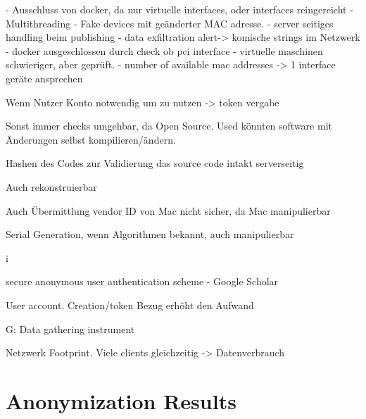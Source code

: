 - Ausschluss von docker, da nur virtuelle interfaces, oder interfaces reingereicht
- Multithreading
- Fake devices mit geänderter MAC adresse.
- server seitiges handling beim publishing
- data exfiltration alert-> komische strings im Netzwerk
- docker ausgeschlossen durch check ob pci interface
- virtuelle maschinen schwieriger, aber geprüft.
- number of available mac addresses -> 1 interface geräte ansprechen

Wenn Nutzer Konto notwendig um zu nutzen -> token vergabe

Sonst immer checks umgehbar, da Open Source. Used könnten software mit Änderungen selbst kompilieren/ändern.

Hashen des Codes zur Validierung das source code intakt serverseitig

Auch rekonstruierbar

Auch Übermittlung vendor ID von Mac nicht sicher, da Mac manipulierbar

Serial Generation, wenn Algorithmen bekannt, auch manipulierbar

i%

secure anonymous user authentication scheme - Google Scholar



User account. Creation/token Bezug erhöht den Aufwand

G: Data gathering instrument

Netzwerk Footprint. Viele clients gleichzeitig -> Datenverbrauch

%
\newpage
%
 


\section{Anonymization Results}
\label{sec:results:anon}


